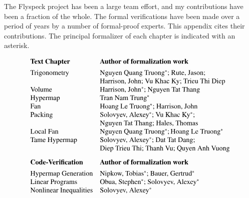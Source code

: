 The Flyspeck project has been a large team effort, and my contributions have
been a fraction of the whole.  The formal verifications have been made
over a period of years by a number of formal-proof experts.  This
appendix cites their contributions. The principal formalizer of each
chapter is indicated with an asterisk.

\def\x#1{\text{#1}}

\[
\begin{array}{lll}
\x{\bf Text~Chapter} & \x{\bf Author~of~formalization~work}
\vspace{4pt}\\
\x{Trigonometry} & \x{Nguyen Quang Truong\ast; Rute, Jason;}
\\&\x{Harrison, John; Vu Khac Ky; Trieu Thi Diep}\\
\x{Volume} & \x{Harrison, John\ast; Nguyen Tat Thang}\\
\x{Hypermap} &  \x{Tran Nam Trung}\ast\\
\x{Fan} & \x{Hoang Le Truong\ast; Harrison, John}\\
\x{Packing} & \x{Solovyev, Alexey\ast; Vu Khac Ky\ast;}\\
&\x{Nguyen Tat Thang; Hales, Thomas}\\
\x{Local Fan} & \x{Nguyen Quang Truong\ast}; \x{Hoang Le Truong\ast}\\
\x{Tame Hypermap} & \x{Solovyev, Alexey\ast; Dat Tat Dang;}\\
&\x{Diep Trieu Thi; Thanh Vu; Quyen Anh Vuong}\vspace{8pt}\\
\x{\bf Code-Verification} & \x{\bf Author~of~formalization~work}
\vspace{4pt}\\
\x{Hypermap Generation} & \x{Nipkow, Tobias\ast; Bauer, Gertrud\ast}\\
\x{Linear Programs} & \x{Obua, Stephen\ast; Solovyev, Alexey\ast}\\
\x{Nonlinear Inequalities} &  \x{Solovyev, Alexey\ast}\\
\end{array}
\]


\[
\begin{array}{lll}

\end{array}
\]


\newpage